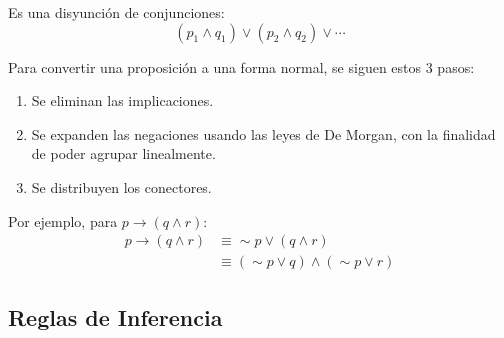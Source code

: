 \documentclass{book}
\begin{document}
  \begin{minipage}{0.45\textwidth}
    \begin{definition}[title=FNC — Forma Normal Conjuntiva]
      Es una disyunción de conjunciones:
      \begin{equation}
        (p_1 \land q_1) \lor (p_2 \land q_2) \lor \cdots
      \end{equation}
    \end{definition}
  \end{minipage}
  
  Para convertir una proposición a una forma normal, se siguen estos 3 pasos:
  
  \begin{enumerate}
    \item Se eliminan las implicaciones.
    \item Se expanden las negaciones usando las leyes de De Morgan, con la finalidad de
    poder agrupar linealmente.
    \item Se distribuyen los conectores.
  \end{enumerate}
  
  Por ejemplo, para $p \to (q \land r)$:
  \begin{align}
    p \to (q \land r) &\equiv \sim p \lor (q \land r) \\
                    &\equiv (\sim p \lor q) \land (\sim p \lor r)
  \end{align}
  
  \subsection{Reglas de Inferencia}
  
\end{document}
